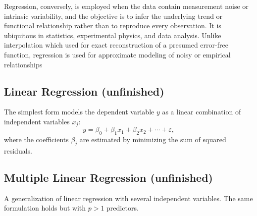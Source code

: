 \documentclass[../../../main.tex]{subfiles}
\begin{document}
Regression, conversely, is employed when the data contain measurement noise or intrinsic variability, and the objective is to infer the underlying trend or functional relationship rather than to reproduce every observation.
It is ubiquitous in statistics, experimental physics, and data analysis.
Unlike interpolation which used for exact reconstruction of a presumed error-free function, regression is used for approximate modeling of noisy or empirical relationships

\subsection{Linear Regression (unfinished)}
The simplest form models the dependent variable \( y \) as a linear combination of independent variables \( x_j \):
\begin{equation*}
    y = \beta_0 + \beta_1 x_1 + \beta_2 x_2 + \cdots + \varepsilon,
\end{equation*}
where the coefficients \( \beta_j \) are estimated by minimizing the sum of squared residuals.

\subsection{Multiple Linear Regression (unfinished)}
A generalization of linear regression with several independent variables.
The same formulation holds but with \( p > 1 \) predictors.
\end{document}
